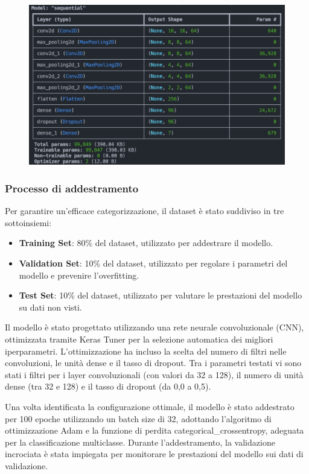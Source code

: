 \begin{figure}[ht]
    \centering
        \centering
        \includegraphics[width=0.8\linewidth]{images/cnn_architecture.png}
        \label{fig:cnn_architecture}
\end{figure}

\subsubsection{Processo di addestramento}
Per garantire un'efficace categorizzazione, il dataset è stato suddiviso in tre sottoinsiemi: 
\begin{itemize}
    \item \textbf{Training Set}: 80\% del dataset, utilizzato per addestrare il modello.
    \item \textbf{Validation Set}: 10\% del dataset, utilizzato per regolare i parametri del modello e prevenire l'overfitting.
    \item \textbf{Test Set}: 10\% del dataset, utilizzato per valutare le prestazioni del modello su dati non visti.
\end{itemize}
Il modello è stato progettato utilizzando una rete neurale convoluzionale (CNN), ottimizzata tramite Keras Tuner per la selezione automatica dei migliori iperparametri. L'ottimizzazione ha incluso la scelta del numero di filtri nelle convoluzioni, le unità dense e il tasso di dropout. Tra i parametri testati vi sono stati i filtri per i layer convoluzionali (con valori da 32 a 128), il numero di unità dense (tra 32 e 128) e il tasso di dropout (da 0,0 a 0,5).

Una volta identificata la configurazione ottimale, il modello è stato addestrato per 100 epoche utilizzando un batch size di 32, adottando l'algoritmo di ottimizzazione Adam e la funzione di perdita categorical\_crossentropy, adeguata per la classificazione multi\-classe. Durante l'addestramento, la validazione incrociata è stata impiegata per monitorare le prestazioni del modello sui dati di validazione.

